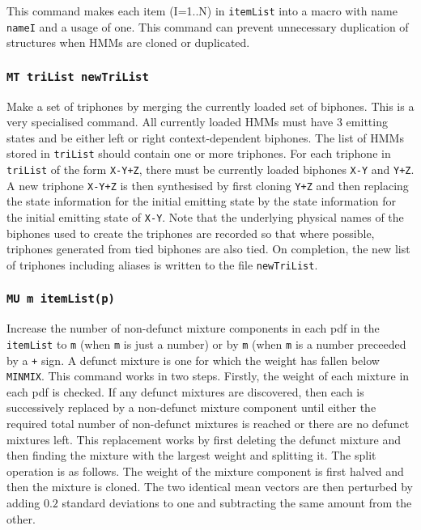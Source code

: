 This command makes each item (I=1..N) in \texttt{itemList} into a 
macro with name \texttt{nameI} and a usage of one.  This command
can prevent unnecessary duplication of structures when HMMs
are cloned or duplicated.

\subsubsection*{\tt MT triList newTriList}

Make  a set of triphones by merging the currently loaded set of
biphones.  This is a very specialised command.  All currently
loaded HMMs must have 3 emitting states and be either left
or right context-dependent biphones.  The list of HMMs stored
in \texttt{triList} should contain one or more triphones.  For
each triphone in \texttt{triList} of the form \texttt{X-Y+Z}, there
must be currently loaded biphones \texttt{X-Y} and \texttt{Y+Z}.
A new triphone \texttt{X-Y+Z} is then synthesised by first cloning
\texttt{Y+Z} and then replacing the state information for the
initial emitting state by the state information for the initial
emitting state of \texttt{X-Y}.  Note that the underlying physical
names of the biphones used to create the triphones are recorded
so that where possible, triphones generated from tied biphones
are also tied.  On completion, the new list of triphones including
aliases is written to the file \texttt{newTriList}.

\subsubsection*{\tt MU m itemList(p)}

Increase the number of non-defunct mixture components
in each pdf in the \texttt{itemList} to \texttt{m} (when \texttt{m} 
is just a number) or by \texttt{m} (when \texttt{m} is a number 
preceeded by a \texttt{+} sign.  A defunct mixture
is one for which the weight has fallen below \texttt{MINMIX}. This command
works in two steps.  Firstly, the weight of each mixture
in each pdf is checked.  If any defunct mixtures are discovered, 
then each is successively replaced by a non-defunct
mixture component until either the required total number of non-defunct
mixtures is reached or there are no defunct mixtures left.
This replacement works by first deleting the defunct mixture
and then finding the mixture with the largest weight and splitting
it.
The split operation is as follows.  The weight of the mixture
component is first halved and then the mixture is cloned.  The
two identical mean vectors are then perturbed by adding $0.2$
standard deviations to one and subtracting the same amount
from the other.

